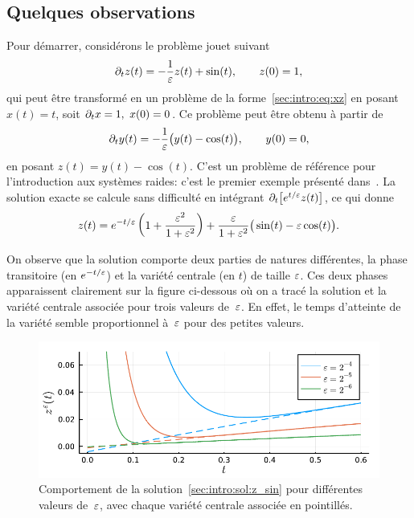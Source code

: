 \subsection*{Quelques observations}

Pour démarrer, considérons le problème jouet suivant
\begin{equation} \label{sec:intro:pb:z_sin}
    \partial_t z(t) = -\frac{1}{\varepsilon}z(t) + \sin(t), 
    \qquad
    z(0) = 1, 
\end{equation}
qui peut être transformé en un problème de la forme~\eqref{sec:intro:eq:xz} en posant $x(t) = t$, soit $\partial_t x = 1,\ x(0) = 0$. Ce problème peut être obtenu à partir de 
\begin{equation*}
    \partial_t y(t) = -\frac{1}{\varepsilon} \big( y(t) - \cos(t) \big), 
    \qquad
    y(0) = 0, 
\end{equation*}
en posant $z(t) = y(t) - \cos(t)$. C'est un problème de référence pour l'introduction aux systèmes raides: c'est le premier exemple présenté dans~\cite{hairer.1996.solving}. La solution exacte se calcule sans difficulté en intégrant $\partial_t \big[ e^{t/\varepsilon} z(t) \big]$, ce qui donne 
\begin{equation} \label{sec:intro:sol:z_sin}
    z(t) = e^{-t/\varepsilon} \left( 1 + \frac{\varepsilon^2}{1+\varepsilon^2} \right)
        + \frac{\varepsilon}{1 + \varepsilon^2} \big( \sin(t) - \varepsilon \cos(t) \big) .
\end{equation}

On observe que la solution comporte deux parties de natures différentes, la phase transitoire (en $e^{-t/\varepsilon}$) et la variété centrale (en $t$) de taille $\varepsilon$. Ces deux phases apparaissent clairement sur la figure ci-dessous où on a tracé la solution et la variété centrale associée pour trois valeurs de~$\varepsilon$. En effet, le temps d'atteinte de la variété semble proportionnel à~$\varepsilon$ pour des petites valeurs. 
%
\begin{figure}[!ht]
    \centering
    \includegraphics{./Presentation/z_sin.pdf}
    \caption{Comportement de la solution~\eqref{sec:intro:sol:z_sin} pour différentes valeurs de~$\varepsilon$, avec chaque variété centrale associée en pointillés.}
\end{figure}

